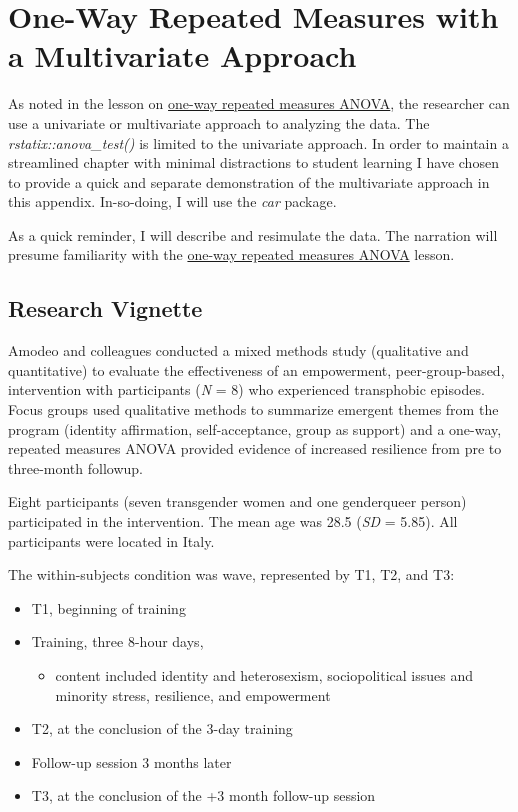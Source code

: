 \documentclass[
  11pt,
]{book}
\providecommand{\tightlist}{%
  \setlength{\itemsep}{0pt}\setlength{\parskip}{0pt}}
\begin{document}
\hypertarget{RMmultiv}{%
\chapter{One-Way Repeated Measures with a Multivariate Approach}\label{RMmultiv}}

As noted in the lesson on \protect\hyperlink{Repeated}{one-way repeated measures ANOVA}, the researcher can use a univariate or multivariate approach to analyzing the data. The \emph{rstatix::anova\_test()} is limited to the univariate approach. In order to maintain a streamlined chapter with minimal distractions to student learning I have chosen to provide a quick and separate demonstration of the multivariate approach in this appendix. In-so-doing, I will use the \emph{car} package.

As a quick reminder, I will describe and resimulate the data. The narration will presume familiarity with the \protect\hyperlink{Repeated}{one-way repeated measures ANOVA} lesson.

\hypertarget{research-vignette-10}{%
\section*{Research Vignette}\label{research-vignette-10}}


Amodeo \citep{amodeo_empowering_2018} and colleagues conducted a mixed methods study (qualitative and quantitative) to evaluate the effectiveness of an empowerment, peer-group-based, intervention with participants (\emph{N} = 8) who experienced transphobic episodes. Focus groups used qualitative methods to summarize emergent themes from the program (identity affirmation, self-acceptance, group as support) and a one-way, repeated measures ANOVA provided evidence of increased resilience from pre to three-month followup.

Eight participants (seven transgender women and one genderqueer person) participated in the intervention. The mean age was 28.5 (\emph{SD} = 5.85). All participants were located in Italy.

The within-subjects condition was wave, represented by T1, T2, and T3:

\begin{itemize}
\tightlist
\item
  T1, beginning of training
\item
  Training, three 8-hour days,

  \begin{itemize}
  \tightlist
  \item
    content included identity and heterosexism, sociopolitical issues and minority stress, resilience, and empowerment
  \end{itemize}
\item
  T2, at the conclusion of the 3-day training
\item
  Follow-up session 3 months later
\item
  T3, at the conclusion of the +3 month follow-up session
\end{itemize}
\end{document}
